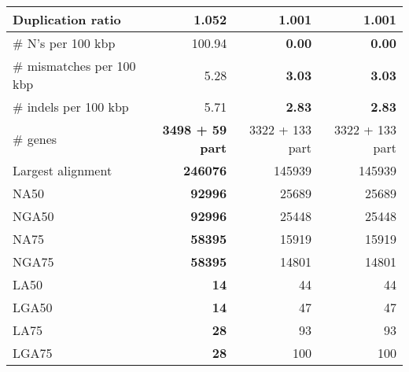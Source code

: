 \documentclass[12pt,a4paper]{article}
\begin{document}
\begin{table}[ht]
\begin{center}
\begin{tabular}{|l*{3}{|r}|}
Duplication ratio & 1.052 & {\bf 1.001} & {\bf 1.001} \\ \hline
\# N's per 100 kbp & 100.94 & {\bf 0.00} & {\bf 0.00} \\ \hline
\# mismatches per 100 kbp & 5.28 & {\bf 3.03} & {\bf 3.03} \\ \hline
\# indels per 100 kbp & 5.71 & {\bf 2.83} & {\bf 2.83} \\ \hline
\# genes & {\bf 3498 + 59 part} & 3322 + 133 part & 3322 + 133 part \\ \hline
Largest alignment & {\bf 246076} & 145939 & 145939 \\ \hline
NA50 & {\bf 92996} & 25689 & 25689 \\ \hline
NGA50 & {\bf 92996} & 25448 & 25448 \\ \hline
NA75 & {\bf 58395} & 15919 & 15919 \\ \hline
NGA75 & {\bf 58395} & 14801 & 14801 \\ \hline
LA50 & {\bf 14} & 44 & 44 \\ \hline
LGA50 & {\bf 14} & 47 & 47 \\ \hline
LA75 & {\bf 28} & 93 & 93 \\ \hline
LGA75 & {\bf 28} & 100 & 100 \\ \hline
\end{tabular}
\end{center}
\end{table}
\end{document}
